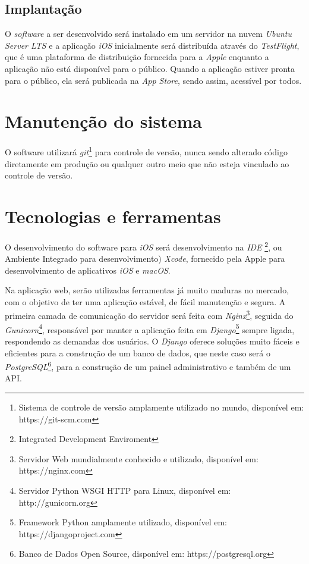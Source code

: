 \documentclass[
	12pt,
	oneside,
	a4paper,
	english,
	brazil,
]{abntex2}
\begin{document}
\subsection{Implantação}

O \emph{software} a ser desenvolvido será instalado em um servidor na nuvem \emph{Ubuntu Server LTS} e a aplicação \emph{iOS} inicialmente será distribuída através do \emph{TestFlight}, que é uma plataforma de distribuição fornecida para a \emph{Apple} enquanto a aplicação não está disponível para o público. Quando a aplicação estiver pronta para o público, ela será publicada na \emph{App Store}, sendo assim, acessível por todos.

\section{Manutenção do sistema}

O software utilizará \emph{git}\footnote{Sistema de controle de versão amplamente utilizado no mundo, disponível em: https://git-scm.com} para controle de versão, nunca sendo alterado código diretamente em produção ou qualquer outro meio que não esteja vinculado ao controle de versão.

\section{Tecnologias e ferramentas}

O desenvolvimento do software para \emph{iOS} será desenvolvimento na \emph{IDE} \footnote{Integrated Development Enviroment}, ou Ambiente Integrado para desenvolvimento) \emph{Xcode}, fornecido pela Apple para desenvolvimento de aplicativos \emph{iOS} e \emph{macOS}.

Na aplicação web, serão utilizadas ferramentas já muito maduras no mercado, com o objetivo de ter uma aplicação estável, de fácil manutenção e segura. A primeira camada de comunicação do servidor será feita com \emph{Nginx}\footnote{Servidor Web mundialmente conhecido e utilizado, disponível em: https://nginx.com}, seguida do \emph{Gunicorn}\footnote{Servidor Python WSGI HTTP para Linux, disponível em: http://gunicorn.org}, responsável por manter a aplicação feita em \emph{Django}\footnote{Framework Python amplamente utilizado, disponível em: https://djangoproject.com} sempre ligada, respondendo as demandas dos usuários. O \emph{Django} oferece soluções muito fáceis e eficientes para a construção de um banco de dados, que neste caso será o \emph{PostgreSQL}\footnote{Banco de Dados Open Source, disponível em: https://postgresql.org}, para a construção de um painel administrativo e também de um API.
\end{document}
